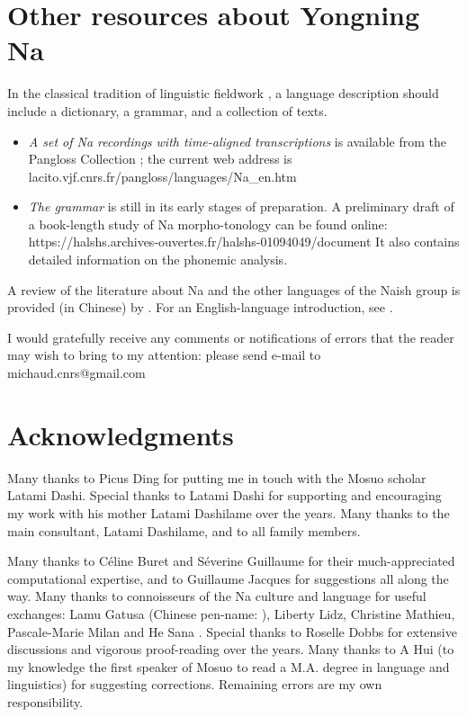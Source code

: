 	\section{Other resources about Yongning Na} \label{sec:resources}
	
	In the classical tradition of linguistic fieldwork \citep{Dixon2007}, a language description should include a dictionary, a grammar, and a collection of texts. 
	
	\begin{itemize}
		\item \textit{A set of Na recordings with time-aligned transcriptions} is available from the Pangloss Collection \citep{Michailovsky2014}; the current web address is lacito.vjf.cnrs.fr/pangloss/languages/Na\_en.htm 
		\item \textit{The grammar} is still in its early stages of preparation. A preliminary draft of a book-length study of Na morpho-tonology can be found online: https://halshs.archives-ouvertes.fr/halshs-01094049/document It also contains detailed information on the phonemic analysis.
	\end{itemize}
	
A review of the literature about Na and the other languages of the Naish  group is provided (in Chinese) by \citet{Li2015}. For an English-language introduction, see \citet{Michaud2015b}.

I would gratefully receive any comments or notifications of errors that the reader may wish to bring to my attention: please send e-mail to michaud.cnrs@gmail.com 


	\section{Acknowledgments} \label{sec:ackno}

Many thanks to Picus Ding for putting me in touch with the Mosuo scholar Latami Dashi. Special thanks to Latami Dashi for supporting and encouraging my work with his mother Latami Dashilame over the years. Many thanks to the main consultant, Latami Dashilame, and to all family members. 

Many thanks to Céline Buret and Séverine Guillaume for their much-appreciated computational expertise, and to Guillaume Jacques for suggestions all along the way. Many thanks to connoisseurs of the Na culture and language for useful exchanges: Lamu Gatusa  (Chinese pen-name: ), Liberty Lidz, Christine Mathieu, Pascale-Marie Milan and He Sana . Special thanks to Roselle Dobbs for extensive discussions and vigorous proof-reading over the years. Many thanks to A Hui  (to my knowledge the first speaker of Mosuo to read a M.A. degree in language and linguistics) for suggesting corrections. Remaining errors are my own responsibility. 

